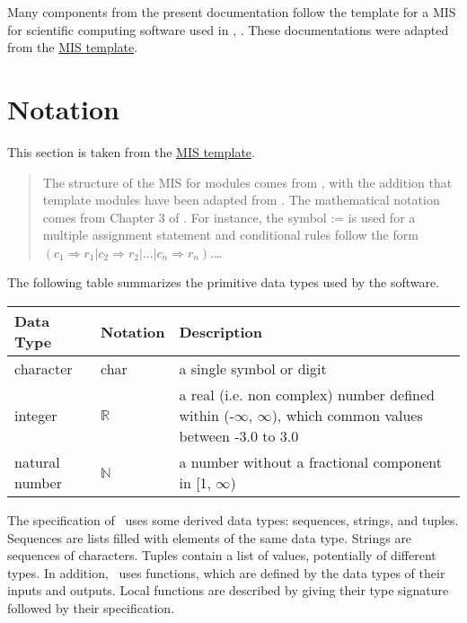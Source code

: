 \documentclass[12pt, titlepage]{article}
\begin{document}
Many components from the present documentation follow the template
 for a MIS for scientific computing software used in \cite{patel2023module}, 
 \cite{bicket2017module}. These documentations were adapted from the \href{https://website-url.com/mis-template}{MIS template}.

 \section{Notation}



This section is taken from the \href{https://website-url.com/mis-template}{MIS template}.

\begin{quote}
The structure of the MIS for modules comes from \citet{HoffmanAndStrooper1995},
with the addition that template modules have been adapted from
\cite{GhezziEtAl2003}.  The mathematical notation comes from Chapter 3 of
\citet{HoffmanAndStrooper1995}.  For instance, the symbol := is used for a
multiple assignment statement and conditional rules follow the form $(c_1
\Rightarrow r_1 | c_2 \Rightarrow r_2 | ... | c_n \Rightarrow r_n )$.\dots
\end{quote}

The following table summarizes the primitive data types used by the \progname software. 

\begin{center}
\renewcommand{\arraystretch}{1.2}
\noindent 
\begin{tabular}{l l p{7.5cm}} 
\toprule 
\textbf{Data Type} & \textbf{Notation} & \textbf{Description}\\ 
\midrule
character & char & a single symbol or digit\\
integer & $\mathbb{R}$ & a real (i.e. non complex) number defined within (-$\infty$, $\infty$), which common values between -3.0 to 3.0 \\
natural number & $\mathbb{N}$ & a number without a fractional component in [1, $\infty$) \\
\bottomrule
\end{tabular} 
\end{center}

\noindent
The specification of \progname \ uses some derived data types: sequences, strings, and
tuples. Sequences are lists filled with elements of the same data type. Strings
are sequences of characters. Tuples contain a list of values, potentially of
different types. In addition, \progname \ uses functions, which
are defined by the data types of their inputs and outputs. Local functions are
described by giving their type signature followed by their specification.
\end{document}
